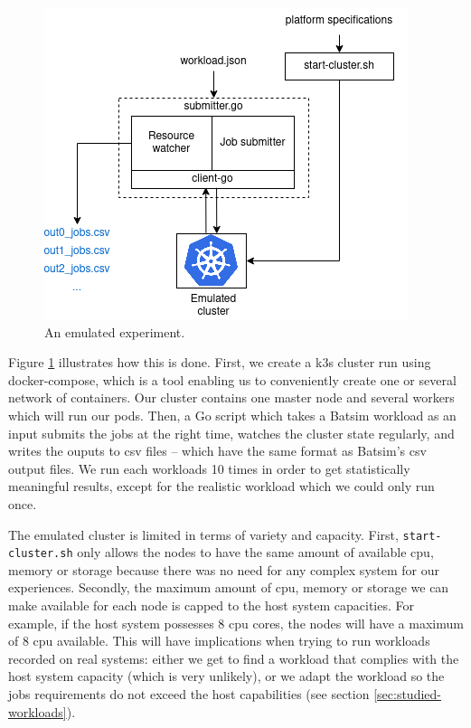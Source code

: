 \begin{figure}[H]
	\centering
	\includegraphics[scale=0.7]{./imgs/prot-k3s.png}
	\caption{An emulated experiment.}
	\label{fig:emulated-expe}
\end{figure}

Figure \ref{fig:emulated-expe} illustrates how this is done. First, we create a
k3s cluster run using docker-compose, which is a tool enabling us to
conveniently create one or several network of containers. Our cluster contains
one master node and several workers which will run our pods. Then, a Go script
which takes a Batsim workload as an input submits the jobs at the right time,
watches the cluster state regularly, and writes the ouputs to csv files --
which have the same format as Batsim's csv output files. We run each workloads
10 times in order to get statistically meaningful results, except for the
realistic workload which we could only run once.

The emulated cluster is limited in terms of variety and capacity. First,
\texttt{start-cluster.sh} only allows the nodes to have the same amount of
available cpu, memory or storage because there was no need for any complex
system for our experiences. Secondly, the maximum amount of cpu, memory or
storage we can make available for each node is capped to the host system
capacities. For example, if the host system possesses 8 cpu cores, the nodes
will have a maximum of 8 cpu available. This will have implications when trying
to run workloads recorded on real systems: either we get to find a workload
that complies with the host system capacity (which is very unlikely), or we
adapt the workload so the jobs requirements do not exceed the host
capabilities (see section \ref{sec:studied-workloads}).

